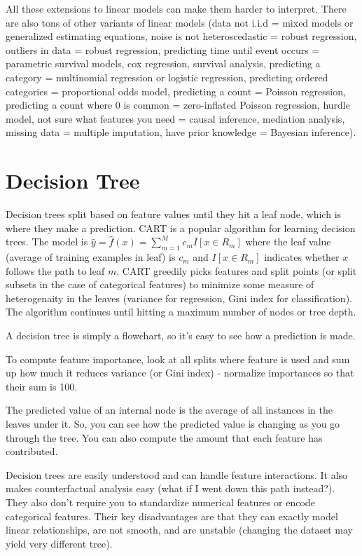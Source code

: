 \documentclass[a4paper]{article}
\begin{document}
All these extensions to linear models can make them harder to interpret. There
are also tons of other variants of linear models (data not i.i.d = mixed models
or generalized estimating equations, noise is not heteroscedastic = robust
regression, outliers in data = robust regression, predicting time until
event occurs = parametric survival models, cox regression, survival analysis,
predicting a category = multinomial regression or logistic regression,
predicting ordered categories = proportional odds model, predicting a count
= Poisson regression, predicting a count where 0 is common = zero-inflated Poisson
regression, hurdle model, not sure what features you need = causal inference,
mediation analysis, missing data = multiple imputation, have prior knowledge
= Bayesian inference).

\section{Decision Tree}
Decision trees split based on feature values until they hit a leaf node, which
is where they make a prediction. CART is a popular algorithm for learning
decision trees. The model is $\hat{y} = \hat{f}(x) = \sum_{m=1}^{M}{c_m
I[x \in R_m]}$ where the leaf value (average of training examples in leaf) is
$c_m$ and $I[x \in R_m]$ indicates whether $x$ follows the path to leaf $m$.
CART greedily picks features and split points (or split
subsets in the case of categorical features) to minimize some measure of
heterogenaity in the leaves (variance for regression, Gini index for
classification). The algorithm continues until hitting a maximum number of nodes
or tree depth.

A decision tree is simply a flowchart, so it's easy to see how a prediction
is made.

To compute feature importance, look at all splits where feature is used
and sum up how much it reduces variance (or Gini index) - normalize importances
so that their sum is 100.

The predicted value of an internal node is the average of all instances in the
leaves under it. So, you can see how the predicted value is changing as you
go through the tree. You can also compute the amount that each feature
has contributed.

Decision trees are easily understood and can handle feature interactions. It
also makes counterfactual analysis easy (what if I went down this path
instead?). They also don't require you to standardize numerical features or
encode categorical features. Their key disadvantages are that they can exactly
model linear relationships, are not smooth, and are unstable (changing
the dataset may yield very different tree).
\end{document}
